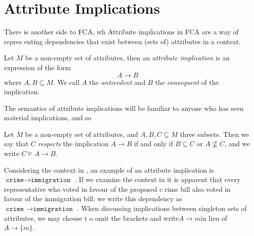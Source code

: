 \section{Attribute Implications}
\label{section:attribute-implications}There is another side to FCA, wh Attribute implications in FCA are a way of repres
enting dependencies that exist between (sets of) attributes in a context.
\begin{definition}
	\label{definition:attribute-implication} Let $M$ be a non-empty set of attributes, then an \emph{attribute implication}
	is an expression of the form
	\[
		A \rightarrow B
	\]
	where $A,B \subseteq M$. We call $A$ the \emph{antecedent} and $B$ the \emph{consequent} of the implication.
\end{definition}
The semantics of attribute implications will be familiar to anyone who has seen material implications, and so
\begin{definition}
	\label{definition:attribute-implication-semantics} Let $M$ be a non-empty set of attributes, and $A,B,C \subseteq M$
	three subsets. Then we say that $C$ \emph{respects} the implication $A \rightarrow B$ if and only if $B \subseteq C$
	or $A \not \subseteq C$, and we write $C \vDash A \rightarrow B$.
\end{definition}
Considering the context in , an example of an attribute implication is$\texttt{crime}\rightarrow
\texttt{immigration }$. If we examine the context in it is apparent that every representative
who voted in favour of the proposed c rime bill also voted in favour of the immigration bill; we write this dependency
as$\texttt{crime }\rightarrow \texttt{immigration }$. When discussing implications between singleton sets of attributes,
we may choose t o omit the brackets and write$A \rightarrow m$in lieu of$A \rightarrow \{m\}$.
